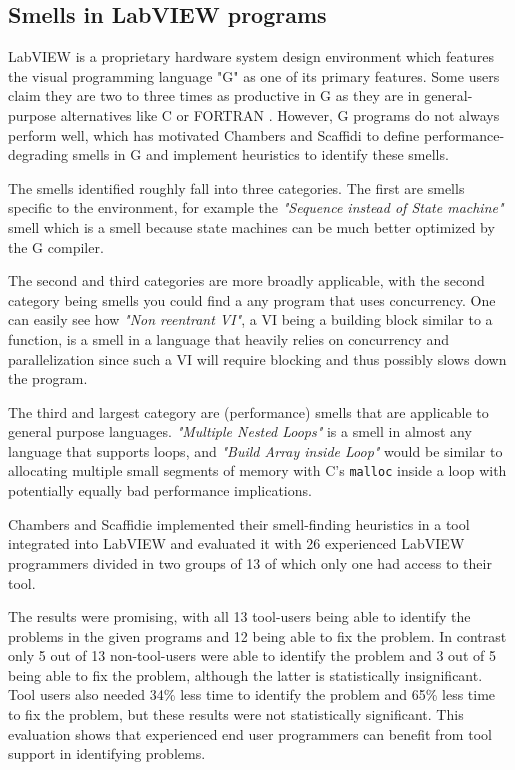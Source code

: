 \documentclass[10pt,conference,compsocconf]{IEEEtran}
\begin{document}
\subsection{Smells in LabVIEW programs}

LabVIEW is a proprietary hardware system design environment which features the visual programming language "G" as one of its primary features.
Some users claim they are two to three times as productive in G as they are in general-purpose alternatives like C or FORTRAN \cite{chambers2013smell}.
However, G programs do not always perform well, which has motivated Chambers and Scaffidi \cite{chambers2013smell} to define performance-degrading smells in G and implement heuristics to identify these smells.

The smells identified roughly fall into three categories. The first are smells specific to the environment, for example the \textit{"Sequence instead of State machine"} smell which is a smell because state machines can be much better optimized by the G compiler.

The second and third categories are more broadly applicable, with the second category being smells you could find a any program that uses concurrency.
One can easily see how \textit{"Non reentrant VI"}, a VI being a building block similar to a function, is a smell in a language that heavily relies on concurrency and parallelization since such a VI will require blocking and thus possibly slows down the program.

The third and largest category are (performance) smells that are applicable to general purpose languages.
\textit{"Multiple Nested Loops"} is a smell in almost any language that supports loops, and \textit{"Build Array inside Loop"} would be similar to allocating multiple small segments of memory with C's \texttt{malloc} inside a loop with potentially equally bad performance implications.

Chambers and Scaffidie implemented their smell-finding heuristics in a tool integrated into LabVIEW and evaluated it with 26 experienced LabVIEW programmers divided in two groups of 13 of which only one had access to their tool.

The results were promising, with all 13 tool-users being able to identify the problems in the given programs and 12 being able to fix the problem.
In contrast only 5 out of 13 non-tool-users were able to identify the problem and 3 out of 5 being able to fix the problem, although the latter is statistically insignificant.
Tool users also needed 34\% less time to identify the problem and 65\% less time to fix the problem, but these results were not statistically significant.
This evaluation shows that experienced end user programmers can benefit from tool support in identifying problems.
\end{document}
